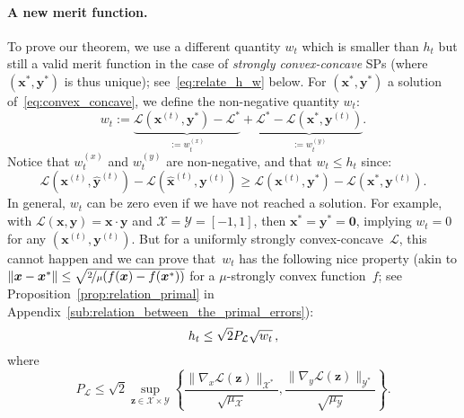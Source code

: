 \documentclass[twoside]{article}
\renewcommand{\L}{\mathcal{L}}
\newcommand{\X}{\mathcal{X}}
\newcommand{\Y}{\mathcal{Y}}
\newcommand{\M}{\X \times \Y}
\newcommand{\x}{\bm{x}}
\newcommand{\y}{\bm{y}}
\newcommand{\z}{\bm{z}}
\newcommand{\xt}{\bm{x}^{(t)}}
\newcommand{\yt}{\bm{y}^{(t)}}
\newcommand{\xtm}{\widehat{\bm{x}}^{(t)}}
\newcommand{\ytm}{\widehat{\bm{y}}^{(t)}}
\newcommand{\0}{\mathbf{0}} %
\begin{document}
\paragraph{A new merit function.} %
\label{par:the_new_quantity}
%
To prove our theorem, we use a different quantity $w_t$ which is smaller than $h_t$ but still a valid merit function in the case of \emph{strongly convex-concave} SPs (where $(\x^*,\y^*)$ is thus unique); see~\eqref{eq:relate_h_w} below. 
For $(\x^*,\y^*)$ a solution of~\eqref{eq:convex_concave}, we define the non-negative quantity $w_t$:
\begin{equation}
 w_t
   := \underbrace{\L(\xt,\y^*) -\L^*}_{:=  w_t^{(x)}} + \underbrace{\L^* - \L(\x^*,\yt)}_{:=w_t^{(y)}}.
\end{equation}
%
%
%
%
%
%
%
%
Notice that $ w_t^{(x)}$ and $w_t^{(y)}$ are non-negative, and that $w_t \leq h_t$ since:
\[
  \L(\xt,\ytm) - \L(\xtm,\yt) \geq \L(\xt,\y^*) - \L(\x^*,\yt).
\]
In general, $w_t$ can be zero even if we have not reached a solution.
For example, with $\L(\x,\y) = \x \cdot \y$ and $\X = \Y = [-1,1]$, then $\x^* = \y^* = \0$, implying $w_t = 0$ for any $(\x^{(t)},\y^{(t)})$. 
But for a uniformly strongly convex-concave~$\L$, this cannot happen and we can prove that~$w_t$ has the following nice property (akin to $\|\x - \x^*\| \leq \sqrt{\nicefrac{2}{\mu} (f(\x) - f(\x^*))}$ for a $\mu$-strongly convex function~$f$; see Proposition~\ref{prop:relation_primal} in Appendix~\ref{sub:relation_between_the_primal_errors}):
\begin{equation} \label{eq:relate_h_w}
  h_t \leq \sqrt{2} P_\L \sqrt{w_t} \, , \vspace{-1mm} 
\end{equation}
where 
%
%
%
%
%
\begin{equation}
  \!\!\! P_\L \leq \sqrt{2} \underset{\z \in \M}{\sup} \left\{\frac{\|\nabla_x \L(\z)\|_{\X^*}}{\sqrt{\mu_\X}} ,\frac{\|\nabla_y \L(\z)\|_{\Y^*}}{\sqrt{\mu_\Y}}   \right\} .
\end{equation}
%
\end{document}
